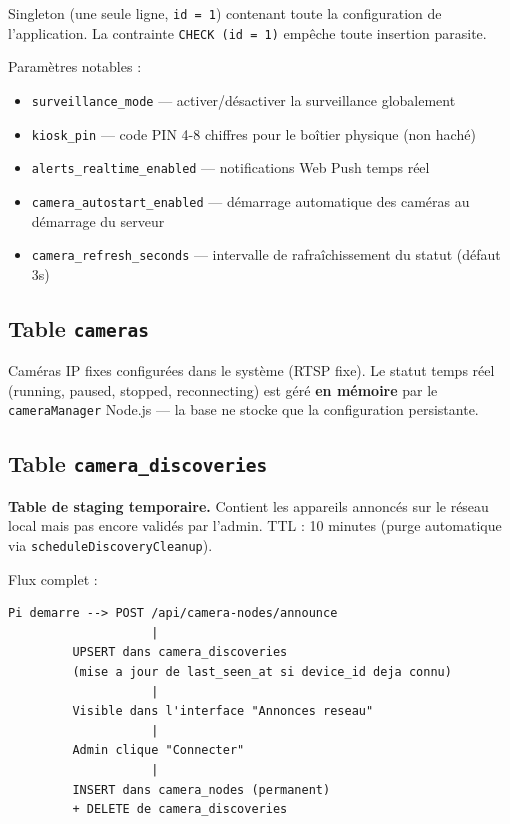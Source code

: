 \documentclass[12pt,a4paper]{article}
\begin{document}
Singleton (une seule ligne, \texttt{id = 1}) contenant toute la configuration de l'application.
La contrainte \texttt{CHECK (id = 1)} empêche toute insertion parasite.

Paramètres notables :
\begin{itemize}
  \item \texttt{surveillance\_mode} — activer/désactiver la surveillance globalement
  \item \texttt{kiosk\_pin} — code PIN 4-8 chiffres pour le boîtier physique (non haché)
  \item \texttt{alerts\_realtime\_enabled} — notifications Web Push temps réel
  \item \texttt{camera\_autostart\_enabled} — démarrage automatique des caméras au démarrage du serveur
  \item \texttt{camera\_refresh\_seconds} — intervalle de rafraîchissement du statut (défaut 3s)
\end{itemize}

\subsection{Table \texttt{cameras}}

Caméras IP fixes configurées dans le système (RTSP fixe).
Le statut temps réel (running, paused, stopped, reconnecting) est géré \textbf{en mémoire}
par le \texttt{cameraManager} Node.js — la base ne stocke que la configuration persistante.

\subsection{Table \texttt{camera\_discoveries}}

\textbf{Table de staging temporaire.} Contient les appareils annoncés sur le réseau local
mais pas encore validés par l'admin. TTL : 10 minutes (purge automatique via
\texttt{scheduleDiscoveryCleanup}).

Flux complet :
\begin{lstlisting}
Pi demarre --> POST /api/camera-nodes/announce
                    |
         UPSERT dans camera_discoveries
         (mise a jour de last_seen_at si device_id deja connu)
                    |
         Visible dans l'interface "Annonces reseau"
                    |
         Admin clique "Connecter"
                    |
         INSERT dans camera_nodes (permanent)
         + DELETE de camera_discoveries
\end{lstlisting}
\end{document}
